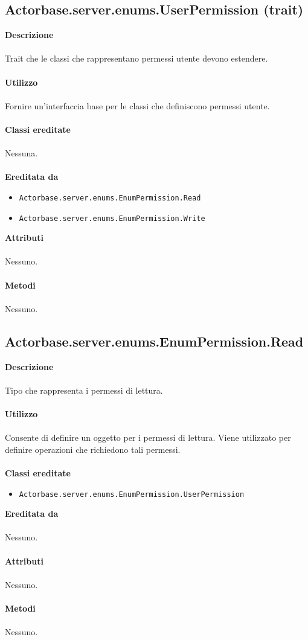 \documentclass[a4paper]{article}
\begin{document}
	\subsection{Actorbase.server.enums.UserPermission (trait)}
		\textbf{Descrizione}
			\\ \\
			Trait che le classi che rappresentano permessi utente devono estendere.
			\\ \\
		\textbf{Utilizzo}
			\\ \\
			Fornire un'interfaccia base per le classi che definiscono permessi utente.
			\\ \\
		\textbf{Classi ereditate}
		\\ \\
		Nessuna.
		\\ \\
		\textbf{Ereditata da}
			\begin{itemize}
				\item \texttt{Actorbase.server.enums.EnumPermission.Read}
				\item \texttt{Actorbase.server.enums.EnumPermission.Write}
			\end{itemize}
		\textbf{Attributi}
		\\ \\
				Nessuno.
		\\ \\
		\textbf{Metodi}
			\\ \\
			Nessuno.
			
			
	\subsection{Actorbase.server.enums.EnumPermission.Read}
		\textbf{Descrizione}
			\\ \\
			Tipo che rappresenta i permessi di lettura.
			\\ \\
		\textbf{Utilizzo}
			\\ \\
			Consente di definire un oggetto per i permessi di lettura. Viene utilizzato per definire operazioni che richiedono tali permessi.
			\\ \\
		\textbf{Classi ereditate}
			\begin{itemize}
				\item \texttt{Actorbase.server.enums.EnumPermission.UserPermission}
			\end{itemize}
		\textbf{Ereditata da}
			\\ \\
			Nessuno.
			\\ \\
		\textbf{Attributi}
		\\ \\
			Nessuno.
		\\ \\
		\textbf{Metodi}
			\\ \\
			Nessuno.
			
\end{document}
